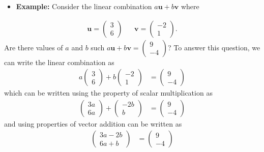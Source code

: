 \documentclass[
]{book}
\providecommand{\tightlist}{%
  \setlength{\itemsep}{0pt}\setlength{\parskip}{0pt}}
\theoremstyle{definition}
\theoremstyle{definition}
\theoremstyle{definition}
\theoremstyle{remark}
\begin{document}
\begin{itemize}
\tightlist
\item
  \textbf{Example:} Consider the linear combination \(a \mathbf{u} + b \mathbf{v}\) where
\end{itemize}

\[
\begin{aligned}
\mathbf{u} = \begin{pmatrix} 3 \\ 6\end{pmatrix} && \mathbf{v} = \begin{pmatrix} -2 \\ 1\end{pmatrix}. \end{aligned}
\]
Are there values of \(a\) and \(b\) such \(a \mathbf{u} + b \mathbf{v} = \begin{pmatrix} 9 \\ - 4 \end{pmatrix}\)? To answer this question, we can write the linear combination as
\[
\begin{aligned}
a \begin{pmatrix} 3 \\ 6\end{pmatrix} + b \begin{pmatrix} -2 \\ 1\end{pmatrix} & = \begin{pmatrix} 9 \\ -4 \end{pmatrix} 
\end{aligned}
\]
which can be written using the property of scalar multiplication as
\[
\begin{aligned}
\begin{pmatrix} 3a \\ 6a \end{pmatrix} + \begin{pmatrix} -2b \\ b \end{pmatrix} & = \begin{pmatrix} 9 \\ -4 \end{pmatrix}
\end{aligned}
\]
and using properties of vector addition can be written as
\[
\begin{aligned}
\begin{pmatrix} 3a - 2b \\ 6a + b \end{pmatrix} & = \begin{pmatrix} 9 \\ -4 \end{pmatrix}
\end{aligned}
\]
\end{document}
